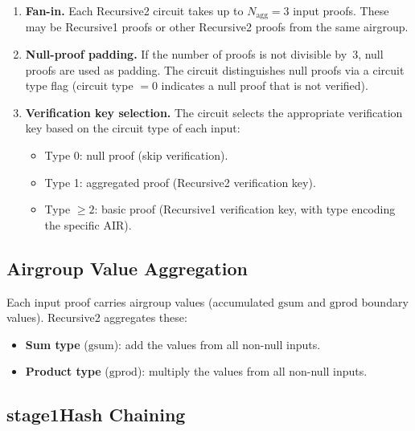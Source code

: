 \begin{enumerate}[label=(\roman*)]
  \item \textbf{Fan-in.}
        Each Recursive2 circuit takes up to
        $N_{\mathrm{agg}} = 3$ input proofs.
        These may be Recursive1 proofs or other Recursive2 proofs
        from the same airgroup.

  \item \textbf{Null-proof padding.}
        If the number of proofs is not divisible by~3,
        null proofs are used as padding.
        The circuit distinguishes null proofs via a circuit type flag
        (circuit type $= 0$ indicates a null proof that is not verified).

  \item \textbf{Verification key selection.}
        The circuit selects the appropriate verification key based on
        the circuit type of each input:
        \begin{itemize}[nosep]
          \item Type 0: null proof (skip verification).
          \item Type 1: aggregated proof (Recursive2 verification key).
          \item Type $\geq 2$: basic proof (Recursive1 verification key,
                with type encoding the specific AIR).
        \end{itemize}
\end{enumerate}

\subsection{Airgroup Value Aggregation}
\label{sec:r2-airgroup-values}

Each input proof carries airgroup values (accumulated $\mathrm{gsum}$ and
$\mathrm{gprod}$ boundary values).
Recursive2 aggregates these:

\begin{itemize}[nosep]
  \item \textbf{Sum type} ($\mathrm{gsum}$):
        add the values from all non-null inputs.
  \item \textbf{Product type} ($\mathrm{gprod}$):
        multiply the values from all non-null inputs.
\end{itemize}

\subsection{stage1Hash Chaining}
\label{sec:r2-stage1hash}

